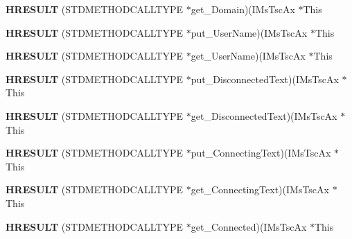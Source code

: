 \begin{DoxyCompactItemize}
\mbox{\label{struct_i_ms_tsc_ax_vtbl_a6380cf7fced955c151fb90de59060bb5}} 
{\bfseries H\+R\+E\+S\+U\+LT} (S\+T\+D\+M\+E\+T\+H\+O\+D\+C\+A\+L\+L\+T\+Y\+PE $\ast$get\+\_\+\+Domain)(I\+Ms\+Tsc\+Ax $\ast$This
\item 
\mbox{\label{struct_i_ms_tsc_ax_vtbl_a106bd47cd96204f5b0b79a3d23bf6d7f}} 
{\bfseries H\+R\+E\+S\+U\+LT} (S\+T\+D\+M\+E\+T\+H\+O\+D\+C\+A\+L\+L\+T\+Y\+PE $\ast$put\+\_\+\+User\+Name)(I\+Ms\+Tsc\+Ax $\ast$This
\item 
\mbox{\label{struct_i_ms_tsc_ax_vtbl_ad22d0cf3b0dcea085a43ca6a2c186a7b}} 
{\bfseries H\+R\+E\+S\+U\+LT} (S\+T\+D\+M\+E\+T\+H\+O\+D\+C\+A\+L\+L\+T\+Y\+PE $\ast$get\+\_\+\+User\+Name)(I\+Ms\+Tsc\+Ax $\ast$This
\item 
\mbox{\label{struct_i_ms_tsc_ax_vtbl_ad558434f125acb34da1f0afc19902bc9}} 
{\bfseries H\+R\+E\+S\+U\+LT} (S\+T\+D\+M\+E\+T\+H\+O\+D\+C\+A\+L\+L\+T\+Y\+PE $\ast$put\+\_\+\+Disconnected\+Text)(I\+Ms\+Tsc\+Ax $\ast$This
\item 
\mbox{\label{struct_i_ms_tsc_ax_vtbl_a7f5fff9808e278b6b3be0fd03dd11e58}} 
{\bfseries H\+R\+E\+S\+U\+LT} (S\+T\+D\+M\+E\+T\+H\+O\+D\+C\+A\+L\+L\+T\+Y\+PE $\ast$get\+\_\+\+Disconnected\+Text)(I\+Ms\+Tsc\+Ax $\ast$This
\item 
\mbox{\label{struct_i_ms_tsc_ax_vtbl_ab57ab6ba0a629812dd1c43cfda64b1ad}} 
{\bfseries H\+R\+E\+S\+U\+LT} (S\+T\+D\+M\+E\+T\+H\+O\+D\+C\+A\+L\+L\+T\+Y\+PE $\ast$put\+\_\+\+Connecting\+Text)(I\+Ms\+Tsc\+Ax $\ast$This
\item 
\mbox{\label{struct_i_ms_tsc_ax_vtbl_a6a93240ea07ef8a9b0ceeb53e7dbca75}} 
{\bfseries H\+R\+E\+S\+U\+LT} (S\+T\+D\+M\+E\+T\+H\+O\+D\+C\+A\+L\+L\+T\+Y\+PE $\ast$get\+\_\+\+Connecting\+Text)(I\+Ms\+Tsc\+Ax $\ast$This
\item 
\mbox{\label{struct_i_ms_tsc_ax_vtbl_a9d630ef1fad7ddb44b44b32a00a09e74}} 
{\bfseries H\+R\+E\+S\+U\+LT} (S\+T\+D\+M\+E\+T\+H\+O\+D\+C\+A\+L\+L\+T\+Y\+PE $\ast$get\+\_\+\+Connected)(I\+Ms\+Tsc\+Ax $\ast$This
\item 

\end{DoxyCompactItemize}
